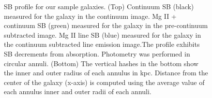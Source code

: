 \documentclass[twocolumn]{aastex61}
\begin{document}
\begin{figure}
\centering
{}
\caption{SB profile for our sample galaxies. (Top) Continuum SB (black) measured for the galaxy in the continuum image. Mg II + continuum SB (green) measured for the galaxy in the pre-continuum subtracted image. Mg II line SB (blue) measured for the galaxy in the continuum subtracted line emission image.The profile exhibits SB decrements from  absorption. Photometry was performed in circular annuli. (Bottom) The vertical hashes in the bottom show the inner and outer radius of each annulus in kpc. Distance from the center of the galaxy (x-axis) is computed using the average value of each annulus inner and outer radii of each annuli.}
\label{fig:sb_profiles}
\end{figure}
\end{document}

